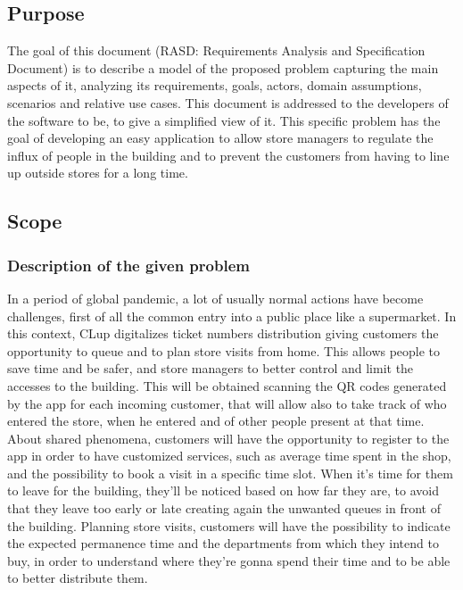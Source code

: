 \documentclass{article}
\begin{document}
     	\subsection{Purpose}
	The goal of this document (RASD: Requirements Analysis and Specification Document) is to describe a model of the proposed     	problem capturing the main aspects of it, analyzing its requirements, goals, actors, domain assumptions, scenarios and relative 	use cases. This document is addressed to the developers of the software to be, to give a simplified view of it. 
	This specific problem has the goal of  developing an easy application to allow store managers to regulate the influx of people in the 	building and to prevent the customers from having to line up outside stores for a long time.

         \subsection{Scope}
         \subsubsection {Description of the given problem}
         In a period of global pandemic, a lot of usually normal actions have become challenges, first of all the common entry into a public 	place like a supermarket. In this context, CLup digitalizes ticket numbers distribution giving customers the opportunity to queue and 	to plan store visits from home. This allows people to save time and be safer, and store managers to better control and limit the 		accesses to the building. This will be obtained scanning the QR codes generated by the app for each incoming customer, that will 	allow also to take track of who entered the store, when he entered and of other people present at that time.
	About shared phenomena, customers will have the opportunity to register to the app in order to have customized services, such as 	average time spent in the shop, and the possibility to book a visit in a specific time slot. When it’s time for them to leave for the 		building, they’ll be noticed based on how far they are, to avoid that they leave too early or late creating again the unwanted queues 	in front of the building.
	Planning store visits, customers will have the possibility to indicate the expected permanence time and the departments from which 	they intend to buy, in order to understand where they’re gonna spend their time and to be able to better distribute them.
\end{document}
